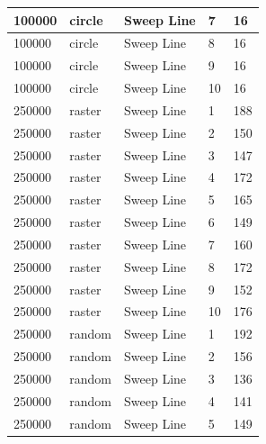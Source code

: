 \documentclass[12pt]{article}
\begin{document}
\begin{longtable}{|l|l|l|l|l|}
100000       & circle            & Sweep Line & 7          & 16                            \\ \hline
100000       & circle            & Sweep Line & 8          & 16                            \\ \hline
100000       & circle            & Sweep Line & 9          & 16                            \\ \hline
100000       & circle            & Sweep Line & 10         & 16                            \\ \hline
250000       & raster            & Sweep Line & 1          & 188                           \\ \hline
250000       & raster            & Sweep Line & 2          & 150                           \\ \hline
250000       & raster            & Sweep Line & 3          & 147                           \\ \hline
250000       & raster            & Sweep Line & 4          & 172                           \\ \hline
250000       & raster            & Sweep Line & 5          & 165                           \\ \hline
250000       & raster            & Sweep Line & 6          & 149                           \\ \hline
250000       & raster            & Sweep Line & 7          & 160                           \\ \hline
250000       & raster            & Sweep Line & 8          & 172                           \\ \hline
250000       & raster            & Sweep Line & 9          & 152                           \\ \hline
250000       & raster            & Sweep Line & 10         & 176                           \\ \hline
250000       & random            & Sweep Line & 1          & 192                           \\ \hline
250000       & random            & Sweep Line & 2          & 156                           \\ \hline
250000       & random            & Sweep Line & 3          & 136                           \\ \hline
250000       & random            & Sweep Line & 4          & 141                           \\ \hline
250000       & random            & Sweep Line & 5          & 149                           \\ \hline

\end{longtable}
\end{document}
